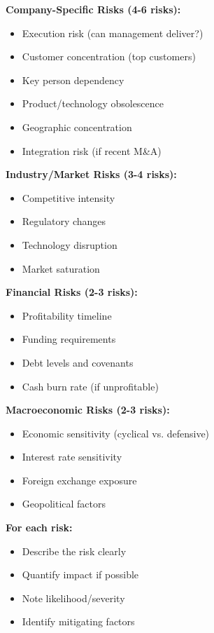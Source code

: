 \documentclass[11pt]{article}
\begin{document}
\textbf{Company-Specific Risks (4-6 risks):}

\begin{itemize}[leftmargin=*,itemsep=2pt,topsep=2pt]
\item {} Execution risk (can management deliver?)
\item {} Customer concentration (top customers)
\item {} Key person dependency
\item {} Product/technology obsolescence
\item {} Geographic concentration
\item {} Integration risk (if recent M\&A)
\end{itemize}

\textbf{Industry/Market Risks (3-4 risks):}

\begin{itemize}[leftmargin=*,itemsep=2pt,topsep=2pt]
\item {} Competitive intensity
\item {} Regulatory changes
\item {} Technology disruption
\item {} Market saturation
\end{itemize}

\textbf{Financial Risks (2-3 risks):}

\begin{itemize}[leftmargin=*,itemsep=2pt,topsep=2pt]
\item {} Profitability timeline
\item {} Funding requirements
\item {} Debt levels and covenants
\item {} Cash burn rate (if unprofitable)
\end{itemize}

\textbf{Macroeconomic Risks (2-3 risks):}

\begin{itemize}[leftmargin=*,itemsep=2pt,topsep=2pt]
\item {} Economic sensitivity (cyclical vs. defensive)
\item {} Interest rate sensitivity
\item {} Foreign exchange exposure
\item {} Geopolitical factors
\end{itemize}

\textbf{For each risk:}

\begin{itemize}[leftmargin=*,itemsep=2pt,topsep=2pt]
\item {} Describe the risk clearly
\item {} Quantify impact if possible
\item {} Note likelihood/severity
\item {} Identify mitigating factors
\end{itemize}
\end{document}
